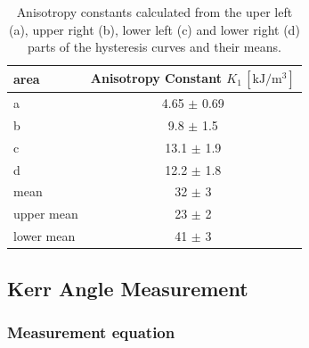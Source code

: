 \documentclass[a4paper,10pt]{scrartcl}
\begin{document}
\begin{table}
\begin{center}
\begin{tabular}{lc}
\toprule
area       & Anisotropy Constant $K_1\,[\mbox{kJ}/\mbox{m}^3]$ \\
\midrule
a          & \phantom{0}4.65 $\pm$ 0.69 \\
b          & \phantom{0}9.8 $\pm$ 1.5 \\
c          & 13.1 $\pm$ 1.9 \\
d          & 12.2 $\pm$ 1.8 \\
mean       & 32 $\pm$ 3 \\
upper mean & 23 $\pm$ 2 \\
lower mean & 41 $\pm$ 3 \\
\bottomrule
\end{tabular}
\end{center}
\par
\caption{Anisotropy constants calculated from the uper left (a), upper right (b), lower left (c) and lower right (d) parts of the hysteresis curves and their means. \label{tab:a1fits}}
\end{table}


\subsection{Kerr Angle Measurement}

\subsubsection{Measurement equation}
\end{document}
